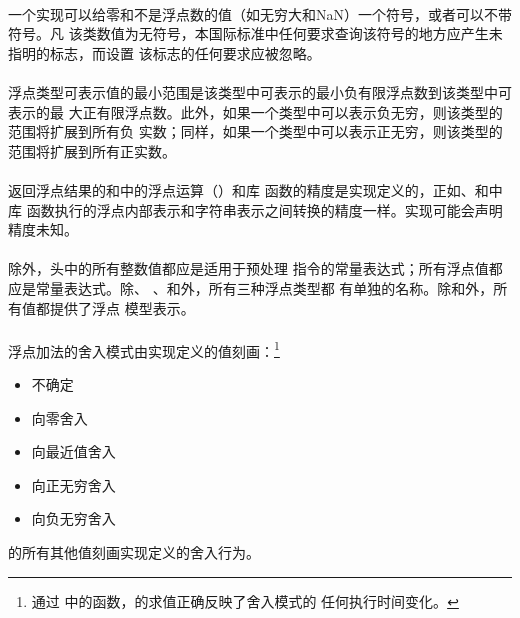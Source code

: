 \paragraph{}
一个实现可以给零和不是浮点数的值（如无穷大和NaN）一个符号，或者可以不带符号。凡
该类数值为无符号，本国际标准中任何要求查询该符号的地方应产生未指明的标志，而设置
该标志的任何要求应被忽略。

\paragraph{}
浮点类型可表示值的最小范围是该类型中可表示的最小负有限浮点数到该类型中可表示的最
大正有限浮点数。此外，如果一个类型中可以表示负无穷，则该类型的范围将扩展到所有负
实数；同样，如果一个类型中可以表示正无穷，则该类型的范围将扩展到所有正实数。

\paragraph{}
返回浮点结果的和中的浮点运算（）和库
函数的精度是实现定义的，正如、和中库
函数执行的浮点内部表示和字符串表示之间转换的精度一样。实现可能会声明精度未知。

\paragraph{}
除外，头中的所有整数值都应是适用于预处理
指令的常量表达式；所有浮点值都应是常量表达式。除、
、和外，所有三种浮点类型都
有单独的名称。除和外，所有值都提供了浮点
模型表示。

\paragraph{}
浮点加法的舍入模式由实现定义的值刻画：\footnote{通过
中的函数，的求值正确反映了舍入模式的
任何执行时间变化。}
\begin{itemize}
  \item[]{  \qquad 不确定}
  \item[]{ \qquad 向零舍入}
  \item[]{ \qquad 向最近值舍入}
  \item[]{ \qquad 向正无穷舍入}
  \item[]{ \qquad 向负无穷舍入}
\end{itemize}
的所有其他值刻画实现定义的舍入行为。

